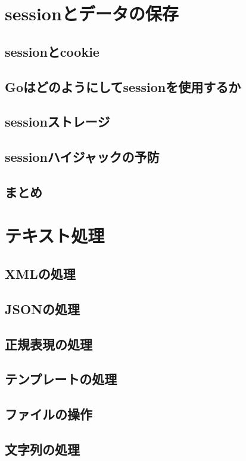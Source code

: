 \section{sessionとデータの保存}

\subsection{sessionとcookie}

\subsection{Goはどのようにしてsessionを使用するか}

\subsection{sessionストレージ}

\subsection{sessionハイジャックの予防}

\subsection{まとめ}


\section{テキスト処理}

\subsection{XMLの処理}

\subsection{JSONの処理}

\subsection{正規表現の処理}

\subsection{テンプレートの処理}

\subsection{ファイルの操作}

\subsection{文字列の処理}

